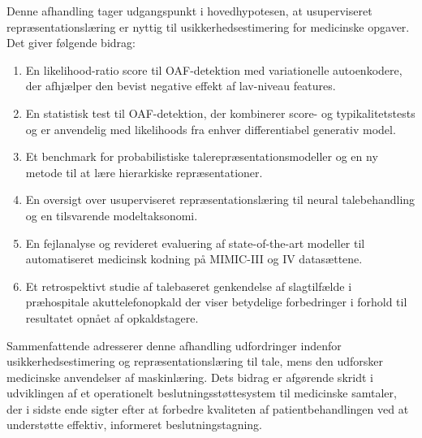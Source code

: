 Denne afhandling tager udgangspunkt i hovedhypotesen, at usuperviseret repræsentationslæring er nyttig til usikkerhedsestimering for medicinske opgaver.
Det giver følgende bidrag:
%
\begin{enumerate}[topsep=3pt, partopsep=0pt, itemsep=3pt, parsep=0pt, leftmargin=2em, label=(\alph*)] %
    \item En likelihood-ratio score til OAF-detektion med variationelle autoenkodere, der afhjælper den bevist negative effekt af lav-niveau features.
    \item En statistisk test til OAF-detektion, der kombinerer score- og typikalitetstests og er anvendelig med likelihoods fra enhver differentiabel generativ model.
    \item Et benchmark for probabilistiske talerepræsentationsmodeller og en ny metode til at lære hierarkiske repræsentationer.
    \item En oversigt over usuperviseret repræsentationslæring til neural talebehandling og en tilsvarende modeltaksonomi.
    \item En fejlanalyse og revideret evaluering af state-of-the-art modeller til automatiseret medicinsk kodning på MIMIC-III og IV datasættene.
    \item Et retrospektivt studie af talebaseret genkendelse af slagtilfælde i præhospitale akuttelefonopkald der viser betydelige forbedringer i forhold til resultatet opnået af opkaldstagere.\end{enumerate}
%
Sammenfattende adresserer denne afhandling udfordringer indenfor usikkerhedsestimering og repræsentationslæring til tale, mens den udforsker medicinske anvendelser af maskinlæring. 
Dets bidrag er afgørende skridt i udviklingen af et operationelt beslutningsstøttesystem til medicinske samtaler, der i sidste ende sigter efter at forbedre kvaliteten af patientbehandlingen ved at understøtte effektiv, informeret beslutningstagning.
